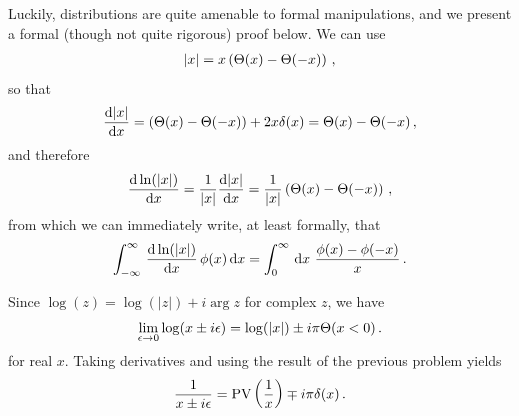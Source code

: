 Luckily, distributions are quite amenable to formal manipulations, and we present a formal (though not quite rigorous) proof below.
%
We can use
\begin{align}
    \abs{x}
    =
    x\left(\Theta(x)-\Theta(-x)\right)
    \,,
\end{align}
so that
\begin{align}
    \dv{\abs{x}}{x}
    =
    \left(\Theta(x)-\Theta(-x)\right)
    +
    2 x \delta(x)
    =
    \Theta(x)-\Theta(-x)
    \,,
\end{align}
and therefore
\begin{align}
    \dv{\ln(\abs{x})}{x}
    =
    \frac{1}{\abs{x}}\dv{\abs{x}}{x}
    =
    \frac{1}{\abs{x}}
    \left(
        \Theta(x)-\Theta(-x)
    \right)
    \,,
\end{align}
from which we can immediately write, at least formally, that
\begin{align}
    \int_{-\infty}^\infty
    \,
    \dv{\ln(\abs{x})}{x}
    \,
    \phi(x)
    \,
    \dd x
    =
    \int_0^\infty
    \,
    \dd x
    \,\,
    \frac{\phi(x) - \phi(-x)}{x}
    \,.
\end{align}





Since \(\log(z) = \log(|z|) + i \arg{z}\) for complex \(z\), we have
\begin{align}
    \lim_{\epsilon \to 0}
    \log(x \pm i \epsilon)
    =
    \log(\abs{x}) \pm i \pi \Theta(x < 0)
    \,.
\end{align}
for real \(x\).
%
Taking derivatives and using the result of the previous problem yields
\begin{align}
    \frac{1}{x \pm i \epsilon}
    =
    \text{PV}\left(\frac{1}{x}\right)
    \mp
    i\pi \delta(x)
    \,.
\end{align}




